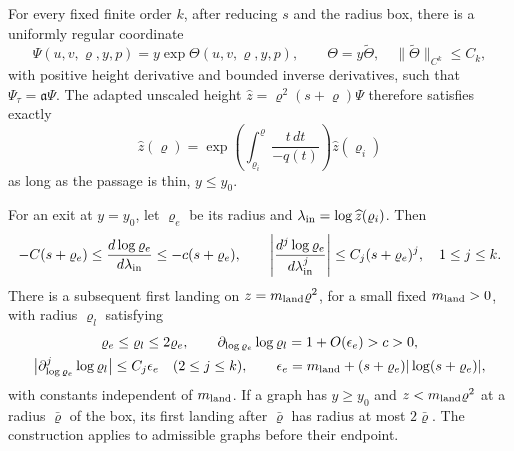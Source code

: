 \begin{lemma}
\label{lem:direct-adaptive-positive}
For every fixed finite order \(k\), after reducing \(s\) and the
radius box, there is a uniformly regular coordinate
\[
 \Psi(u,v,\varrho,y,p)=y\exp\Theta(u,v,\varrho,y,p),\qquad
 \Theta=y\widetilde\Theta,\quad
 \|\widetilde\Theta\|_{C^k}\le C_k,
\]
with positive height derivative and bounded inverse derivatives,
such that \(\Psi_\tau=\mathfrak a\Psi\).
The adapted unscaled height \(\widehat z=\varrho^2(s+\varrho)\Psi\)
therefore satisfies exactly
\begin{equation}
\label{eq:direct-adaptive-action}
 \widehat z(\varrho)=
 \exp\left(\int_{\varrho_i}^{\varrho}\frac{t\,dt}{-q(t)}\right)
 \widehat z(\varrho_i)
\end{equation}
as long as the passage is thin, \(y\le y_0\).

For an exit at \(y=y_0\), let \(\varrho_e\) be its radius and
\(\lambda_{\rm in}=\log\widehat z(\varrho_i)\). Then
\begin{equation}
\label{eq:direct-adaptive-exit}
 -C(s+\varrho_e)\le\frac{d\log\varrho_e}{d\lambda_{\rm in}}
                 \le-c(s+\varrho_e),\qquad
 \left|\frac{d^j\log\varrho_e}{d\lambda_{\rm in}^j}\right|
                 \le C_j(s+\varrho_e)^j,\quad 1\le j\le k .
\end{equation}
There is a subsequent first landing on \(z=m_{\rm land}\varrho^2\), for a
small fixed \(m_{\rm land}>0\), with radius \(\varrho_l\) satisfying
\begin{equation}
\label{eq:direct-adaptive-landing}
 \begin{gathered}
 \varrho_e\le\varrho_l\le2\varrho_e,\qquad
 \partial_{\log\varrho_e}\log\varrho_l=1+O(\epsilon_e)>c>0,\\
 \bigl|\partial_{\log\varrho_e}^j\log\varrho_l\bigr|\le C_j\epsilon_e
       \quad(2\le j\le k),\qquad
 \epsilon_e=m_{\rm land}+(s+\varrho_e)|\log(s+\varrho_e)|,
 \end{gathered}
\end{equation}
with constants independent of \(m_{\rm land}\).
If a graph has \(y\ge y_0\) and \(z<m_{\rm land}\varrho^2\) at a radius
\(\bar\varrho\) of the box, its first landing after \(\bar\varrho\) has
radius at most \(2\bar\varrho\).
The construction applies to admissible graphs before their
endpoint.
\end{lemma}

